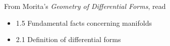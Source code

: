 \documentclass{homework}
\author{Jim Fowler}
\date{Week 4: Exterior algebra}
\begin{document}
\maketitle

From Morita's \textit{Geometry of Differential Forms}, read
\begin{itemize}
\item 1.5 Fundamental facts concerning manifolds
\item 2.1 Definition of differential forms
\end{itemize}
\end{document}
